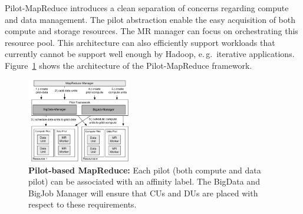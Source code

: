 \documentclass{acm_proc_article-sp}
\newcommand{\pilotmapreduce}{Pilot-MapReduce\xspace}
\begin{document}

Pilot-MapReduce introduces a clean separation of concerns regarding compute and data management. The
pilot abstraction enable the easy acquisition of both compute and storage
resources. The MR manager can focus on orchestrating this resource pool. This architecture can also efficiently support workloads that currently cannot be support well enough by Hadoop, e.\,g.\ iterative applications. Figure~\ref{fig:figures_mapreduce-pilotdata} shows the architecture of the
\pilotmapreduce framework.

\begin{figure}[htbp]
	\centering
	\includegraphics[width=0.4\textwidth]{figures/mapreduce-pilotdata.pdf}
	\caption{\textbf{Pilot-based MapReduce:} Each pilot (both compute and data 
	pilot) can be associated with an affinity label. The BigData and BigJob 
	Manager will ensure that CUs and DUs are placed with respect to these 
	requirements.}
	\label{fig:figures_mapreduce-pilotdata}
\end{figure}
\end{document}
